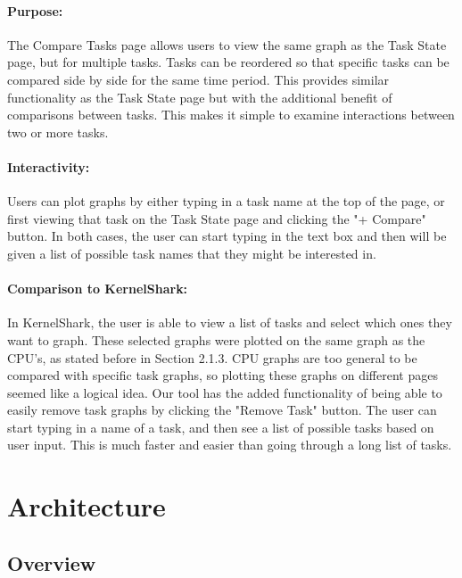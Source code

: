 \documentclass{hmcclinic}
\begin{document}
\paragraph{Purpose:}
The Compare Tasks page allows users to view the same graph as the Task State
page, but for multiple tasks. Tasks can be reordered so that specific tasks can
be compared side by side for the same time period. This provides similar
functionality as the Task State page but with the additional benefit of
comparisons between tasks. This makes it simple to examine interactions between
two or more tasks. 

\paragraph{Interactivity:}
Users can plot graphs by either typing in a task name at the top of the page, or first viewing that task on the Task State page and clicking the "+ Compare" button. In both cases, the user can start typing in the text box and then will be given a list of possible task names that they might be interested in.
    
\paragraph{Comparison to KernelShark:}
    In KernelShark, the user is able to view a list of tasks and select which ones they want to graph. These selected graphs were plotted on the same graph as the CPU's, as stated before in Section 2.1.3. CPU graphs are too general to be compared with specific task graphs, so plotting these graphs on different pages seemed like a logical idea. Our tool has the added functionality of being able to easily remove task graphs by clicking the "Remove Task" button. The user can start typing in a name of a task, and then see a list of possible tasks based on user input. This is much faster and easier than going through a long list of tasks.
    
    
\section{Architecture} %

  \subsection{Overview}
\end{document}
